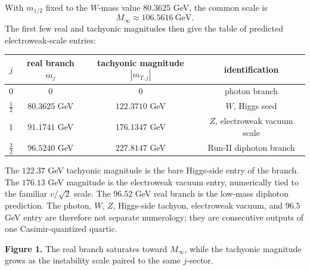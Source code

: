 \documentclass[11pt]{article}
\begin{document}
With \(m_{1/2}\) fixed to the \(W\)-mass value \(80.3625\) GeV, the common scale is
\[
        M_\infty\approx 106.5616\ \text{GeV}.
\]
The first few real and tachyonic magnitudes then give the table of predicted electroweak-scale entries:

\begin{center}
\begin{tabular}{c c c c}
\toprule
\(j\) & real branch \(m_j\) & tachyonic magnitude \(|m_{T,j}|\) & identification \\
\midrule
\(0\) & \(0\) & \(0\) & photon branch \\
\(\frac12\) & \(80.3625\) GeV & \(122.3710\) GeV & \(W\), Higgs seed \\
\(1\) & \(91.1741\) GeV & \(176.1347\) GeV & \(Z\), electroweak vacuum scale \\
\(\frac32\) & \(96.5240\) GeV & \(227.8147\) GeV & Run-II diphoton branch \\
\bottomrule
\end{tabular}
\end{center}

The \(122.37\) GeV tachyonic magnitude is the bare Higgs-side entry of the branch. The \(176.13\) GeV magnitude is the electroweak vacuum entry, numerically tied to the familiar \(v/\sqrt2\) scale. The \(96.52\) GeV real branch is the low-mass diphoton prediction. The photon, \(W\), \(Z\), Higgs-side tachyon, electroweak vacuum, and \(96.5\) GeV entry are therefore not separate numerology; they are consecutive outputs of one Casimir-quantized quartic.

\begin{center}

\textbf{Figure 1.} The real branch saturates toward \(M_\infty\), while the tachyonic magnitude grows as the instability scale paired to the same \(j\)-sector.
\end{center}
\end{document}
